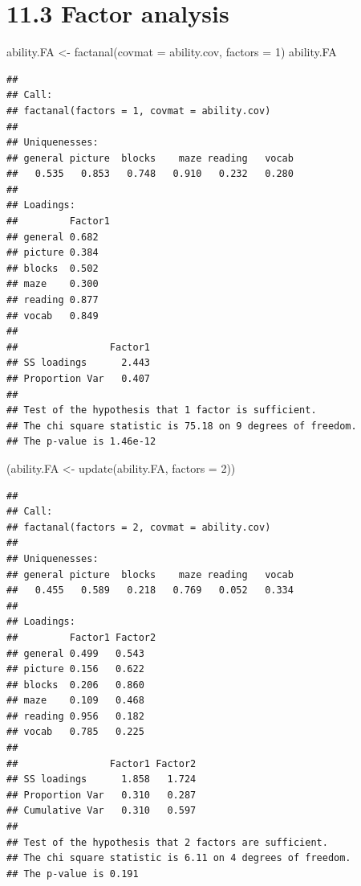 \documentclass[
]{article}
\newenvironment{Shaded}{\begin{snugshade}}{\end{snugshade}}
\newcommand{\AttributeTok}[1]{\textcolor[rgb]{0.77,0.63,0.00}{#1}}
\newcommand{\DecValTok}[1]{\textcolor[rgb]{0.00,0.00,0.81}{#1}}
\newcommand{\FunctionTok}[1]{\textcolor[rgb]{0.00,0.00,0.00}{#1}}
\newcommand{\NormalTok}[1]{#1}
\newcommand{\OtherTok}[1]{\textcolor[rgb]{0.56,0.35,0.01}{#1}}
\begin{document}
\newpage

\hypertarget{factor-analysis}{%
\section{11.3 Factor analysis}\label{factor-analysis}}

\begin{Shaded}
\begin{Highlighting}[]
\NormalTok{ability.FA }\OtherTok{\textless{}{-}} \FunctionTok{factanal}\NormalTok{(}\AttributeTok{covmat =}\NormalTok{ ability.cov, }\AttributeTok{factors =} \DecValTok{1}\NormalTok{)}
\NormalTok{ability.FA}
\end{Highlighting}
\end{Shaded}

\begin{verbatim}
## 
## Call:
## factanal(factors = 1, covmat = ability.cov)
## 
## Uniquenesses:
## general picture  blocks    maze reading   vocab 
##   0.535   0.853   0.748   0.910   0.232   0.280 
## 
## Loadings:
##         Factor1
## general 0.682  
## picture 0.384  
## blocks  0.502  
## maze    0.300  
## reading 0.877  
## vocab   0.849  
## 
##                Factor1
## SS loadings      2.443
## Proportion Var   0.407
## 
## Test of the hypothesis that 1 factor is sufficient.
## The chi square statistic is 75.18 on 9 degrees of freedom.
## The p-value is 1.46e-12
\end{verbatim}

\begin{Shaded}
\begin{Highlighting}[]
\NormalTok{(ability.FA }\OtherTok{\textless{}{-}} \FunctionTok{update}\NormalTok{(ability.FA, }\AttributeTok{factors =} \DecValTok{2}\NormalTok{))}
\end{Highlighting}
\end{Shaded}

\begin{verbatim}
## 
## Call:
## factanal(factors = 2, covmat = ability.cov)
## 
## Uniquenesses:
## general picture  blocks    maze reading   vocab 
##   0.455   0.589   0.218   0.769   0.052   0.334 
## 
## Loadings:
##         Factor1 Factor2
## general 0.499   0.543  
## picture 0.156   0.622  
## blocks  0.206   0.860  
## maze    0.109   0.468  
## reading 0.956   0.182  
## vocab   0.785   0.225  
## 
##                Factor1 Factor2
## SS loadings      1.858   1.724
## Proportion Var   0.310   0.287
## Cumulative Var   0.310   0.597
## 
## Test of the hypothesis that 2 factors are sufficient.
## The chi square statistic is 6.11 on 4 degrees of freedom.
## The p-value is 0.191
\end{verbatim}
\end{document}
